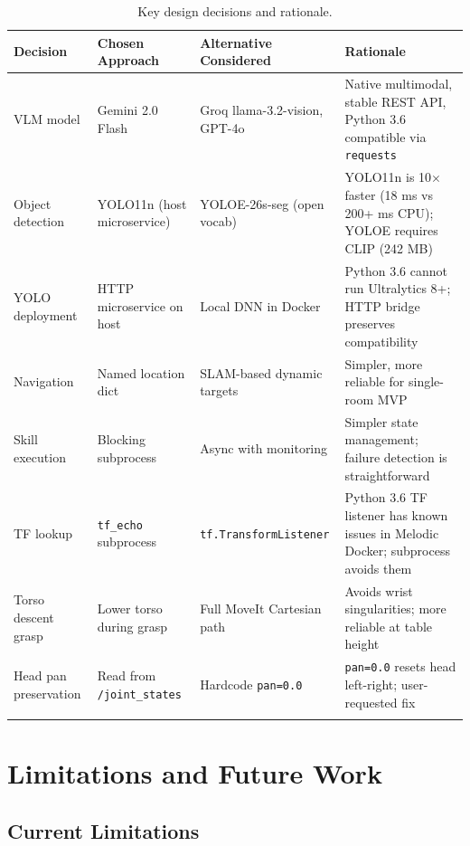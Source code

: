 \documentclass[12pt,a4paper]{report}
\begin{document}
\begin{longtable}{p{3cm}p{4cm}p{4cm}p{3cm}}
\toprule
\textbf{Decision} & \textbf{Chosen Approach} & \textbf{Alternative Considered} & \textbf{Rationale} \\
\midrule
\endhead
VLM model & Gemini 2.0 Flash & Groq llama-3.2-vision, GPT-4o & Native multimodal, stable REST API, Python 3.6 compatible via \texttt{requests} \\
\midrule
Object detection & YOLO11n (host microservice) & YOLOE-26s-seg (open vocab) & YOLO11n is 10$\times$ faster (18 ms vs 200+ ms CPU); YOLOE requires CLIP (242 MB) \\
\midrule
YOLO deployment & HTTP microservice on host & Local DNN in Docker & Python 3.6 cannot run Ultralytics 8+; HTTP bridge preserves compatibility \\
\midrule
Navigation & Named location dict & SLAM-based dynamic targets & Simpler, more reliable for single-room MVP \\
\midrule
Skill execution & Blocking subprocess & Async with monitoring & Simpler state management; failure detection is straightforward \\
\midrule
TF lookup & \texttt{tf\_echo} subprocess & \texttt{tf.TransformListener} & Python 3.6 TF listener has known issues in Melodic Docker; subprocess avoids them \\
\midrule
Torso descent grasp & Lower torso during grasp & Full MoveIt Cartesian path & Avoids wrist singularities; more reliable at table height \\
\midrule
Head pan preservation & Read from \texttt{/joint\_states} & Hardcode \texttt{pan=0.0} & \texttt{pan=0.0} resets head left-right; user-requested fix \\
\bottomrule
\caption{Key design decisions and rationale.}
\end{longtable}

\chapter{Limitations and Future Work}

\section{Current Limitations}
\end{document}
